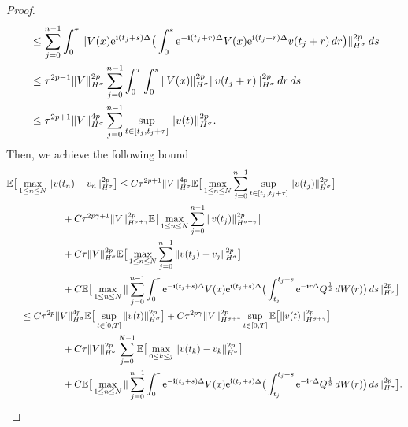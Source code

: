 \documentclass[a4paper]{amsart}
\begin{document}
\begin{proof}
\begin{align*}
&\le \displaystyle\sum_{j=0}^{n-1} \int_0^\tau \|V(x){\rm e}^{{\bf i}(t_j+s)\Delta}\big(\int_{0}^{s}{\rm e}^{-{\bf i}(t_j+r)\Delta}V(x){\rm e}^{{\bf i}(t_j+r)\Delta}v(t_j+r)\,dr\big)\|^{2p}_{H^\sigma}\,ds\\
&\le \tau^{2p-1}\|V\|^{2p}_{H^\sigma}\displaystyle\sum_{j=0}^{n-1}\int_0^\tau \int_0^s \|V(x)\|^{2p}_{H^\sigma} \|v(t_j+r)\|_{H^\sigma}^{2p}\,dr\,ds\\
&\le \tau^{2p+1}\|V\|^{4p}_{H^\sigma}\displaystyle\sum_{j=0}^{n-1}\displaystyle\sup_{t\in [t_j,t_j+\tau]}\|v(t)\|^{2p}_{H^\sigma}.
\end{align*}
Then, we achieve the following bound
\begin{align*}
&\mathbb{E}\big[\max_{1\le n\le N}\|v(t_n)-v_n\|^{2p}_{H^\sigma}\big] \le C\tau^{2p+1}\|V\|^{4p}_{H^\sigma}\mathbb{E}\big[\max_{1\le n \le N} \displaystyle\sum_{j=0}^{n-1}\displaystyle\sup_{t\in[t_j,t_j+\tau]}\|v(t_j)\|^{2p}_{H^\sigma}\big]\\
&\hspace{2cm}+C \tau^{2p\gamma+1}\|V\|^{2p}_{H^{\sigma+\gamma}}\mathbb{E}\big[\max_{1\le n\le N}\displaystyle\sum_{j=0}^{n-1}\|v(t_j)\|^{2p}_{H^{\sigma+\gamma}}\big]\\
& \hspace{2cm}+C\tau \|V\|^{2p}_{H^\sigma}\mathbb{E}\big[\max_{1\le n\le N}\displaystyle\sum_{j=0}^{n-1} \|v(t_j)-v_j\|^{2p}_{H^\sigma}\big]\\
&\hspace{2cm} +C\mathbb{E}\big[\max_{1\le n \le N}\|\displaystyle\sum_{j=0}^{n-1}\int_{0}^{\tau}{\rm e}^{-{\bf i}(t_j+s)\Delta} V(x){\rm e}^{{\bf i}(t_j+s)\Delta}\big(\int_{t_j}^{t_j+s}{\rm e}^{-{\bf i}r \Delta}Q^{\frac{1}{2}}\,dW(r)\big)\,ds\|^{2p}_{H^\sigma}\big]\\
& \hspace{0.5cm}\le C\tau^{2p}\|V\|^{4p}_{H^\sigma}\mathbb{E}\big[\displaystyle\sup_{t\in[0,T]}\|v(t)\|^{2p}_{H^\sigma}\big]+C \tau^{2p\gamma}\|V\|^{2p}_{H^{\sigma+\gamma}}\displaystyle\sup_{t\in[0,T]}\mathbb{E}\big[\|v(t)\|^{2p}_{H^{\sigma+\gamma}}\big]\\
&\hspace{2cm}+C \tau \|V\|^{2p}_{H^\sigma} \displaystyle\sum_{j=0}^{N-1}\mathbb{E}\big[\max_{0\le k\le j}\|v(t_k)-v_k\|^{2p}_{H^\sigma}\big]\\
&\hspace{2cm}+C\mathbb{E}\big[\max_{1\le n \le N}\|\displaystyle\sum_{j=0}^{n-1}\int_{0}^{\tau}{\rm e}^{-{\bf i}(t_j+s)\Delta} V(x){\rm e}^{{\bf i}(t_j+s)\Delta}\big(\int_{t_j}^{t_j+s}{\rm e}^{-{\bf i}r \Delta}Q^{\frac{1}{2}}\,dW(r)\big)\,ds\|^{2p}_{H^\sigma}\big].

\end{align*}
\end{proof}
\end{document}
